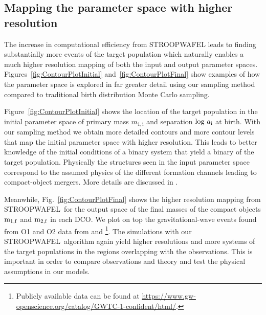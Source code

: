\documentclass[a4paper,fleqn,usenatbib,useAMS,usedcolumn]{mnras}
\newcommand{\AISs}{\textsc{STROOPWAFEL}}
\begin{document}
\subsection{Mapping the parameter space with higher resolution}
\label{subsec:BHNSimprovement_moreHits}

The increase in computational efficiency from \AISs{} leads to  finding substantially more events of the target population which  naturally enables a much higher resolution mapping of both the input and output parameter spaces.   Figures~\ref{fig:ContourPlotInitial} and~\ref{fig:ContourPlotFinal}   show  examples of how the parameter space is explored in far greater detail using our sampling method compared to traditional birth distribution Monte Carlo sampling.  

Figure~\ref{fig:ContourPlotInitial} shows the location of the target population in the initial parameter space of primary mass  $m_{\mathrm{1,i}}$ and separation $\log  \, a_{\rm{i}}$ at birth.  With our sampling method we obtain more detailed contours and more contour levels that map the initial parameter space with higher resolution. This leads to better knowledge of the initial conditions of a binary system that yield a binary of the target population. Physically the structures seen in the input parameter space correspond to the assumed physics of the different formation channels leading to compact-object mergers. More details are discussed in \citet[]{stevenson2017formation,2018MNRAS.481.4009V}.  

Meanwhile, Fig.~\ref{fig:ContourPlotFinal} shows the higher resolution mapping from \AISs \ for the output space of the final  masses of the compact objects  $\rm{m_{\rm{1,f}}}$ and $\rm{m_{\rm{2,f}}}$ in each DCO. We plot on top the gravitational-wave events found from O1 and O2 data from  \citet{2018arXiv181112907T} and \citet{2019arXiv190210331Z}\footnote{Publicly available data can be found at \url{https://www.gw-openscience.org/catalog/GWTC-1-confident/html/}.}. The simulations with our \AISs \ algorithm again yield higher resolutions and more systems of the target populations in the regions overlapping with the observations. This is important in order to compare  observations and theory and test the physical assumptions in our models. 
\end{document}
